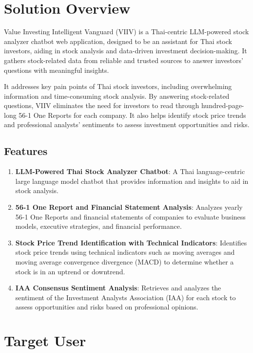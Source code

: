 \section{Solution Overview}
\label{section:solution-overview}

Value Investing Intelligent Vanguard (VIIV) is a Thai-centric LLM-powered stock analyzer chatbot web application, designed to be an assistant for Thai stock investors,
aiding in stock analysis and data-driven investment decision-making. It gathers stock-related data from reliable and trusted sources to answer investors' questions with meaningful insights.

It addresses key pain points of Thai stock investors, including overwhelming information and time-consuming stock analysis. By answering stock-related questions,
VIIV eliminates the need for investors to read through hundred-page-long 56-1 One Reports for each company. It also helps identify stock price trends and professional analysts'
sentiments to assess investment opportunities and risks.

\subsection{Features}
\label{subsection:features}

\begin{enumerate}[leftmargin=80pt]
    \item \textbf{LLM-Powered Thai Stock Analyzer Chatbot}: A Thai language-centric large language model chatbot that provides information and insights to aid in stock analysis.
    \item \textbf{56-1 One Report and Financial Statement Analysis}: Analyzes yearly 56-1 One Reports and financial statements of companies to evaluate business models, executive strategies, and financial performance.
    \item \textbf{Stock Price Trend Identification with Technical Indicators}: Identifies stock price trends using technical indicators such as moving averages and moving average convergence divergence (MACD) to determine whether a stock is in an uptrend or downtrend.
    \item \textbf{IAA Consensus Sentiment Analysis}: Retrieves and analyzes the sentiment of the Investment Analysts Association (IAA) for each stock to assess opportunities and risks based on professional opinions.
\end{enumerate}

\section{Target User}
\label{section:target-user}

